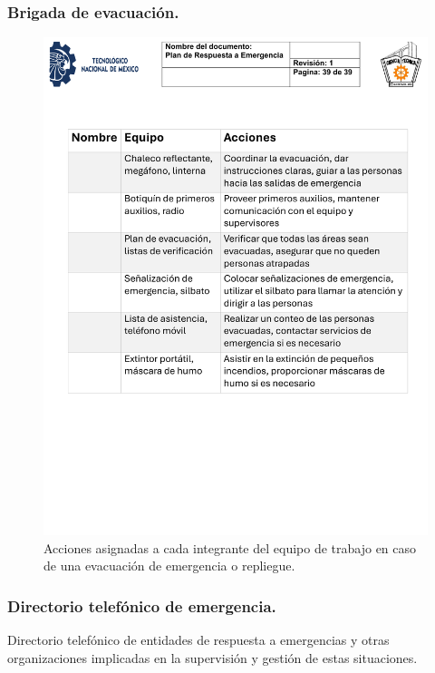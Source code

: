     \subsubsection{Brigada de evacuación.}
    \begin{figure}[H]
        \centering
        \includegraphics[scale=0.4]{15/img/tablaBrigadaEvacuacion.pdf}
        \caption{Acciones asignadas a cada integrante del equipo de trabajo en caso de una evacuación de emergencia o repliegue.}
        \label{fig:brigada}
    \end{figure}
    \subsubsection{Directorio telefónico de emergencia.}
    Directorio telefónico de entidades de respuesta a emergencias y otras organizaciones implicadas en la supervisión y gestión de estas situaciones.
    
